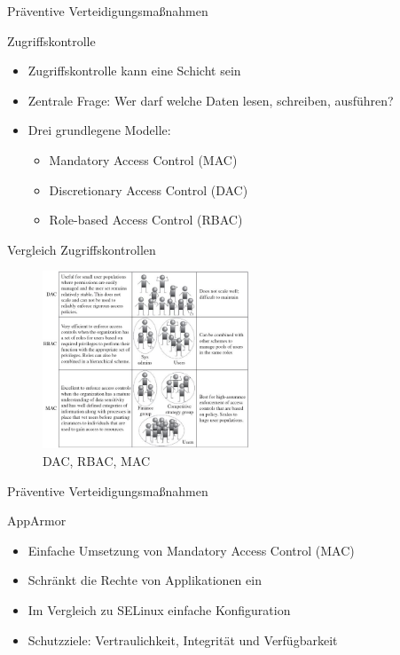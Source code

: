 \begin{frame}{Präventive Verteidigungsmaßnahmen}
  \begin{block}{Zugriffskontrolle}
    \begin{itemize}[<+->]
      \item Zugriffskontrolle kann eine Schicht sein
      \item Zentrale Frage: Wer darf welche Daten lesen, schreiben, ausführen?
      \item Drei grundlegene Modelle:
      \begin{itemize}[<+->]
        \item Mandatory Access Control (MAC)
        \item Discretionary Access Control (DAC)
        \item Role-based Access Control (RBAC)
      \end{itemize}
    \end{itemize}
  \end{block}
\end{frame}

\begin{frame}{Vergleich Zugriffskontrollen}
  \begin{figure}
    \centering
    \includegraphics[width=0.55\textwidth]{assets/access_control}
    \caption{DAC, RBAC, MAC \footnotemark}
  \end{figure}

\end{frame}

\begin{frame}{Präventive Verteidigungsmaßnahmen}
  \begin{block}{AppArmor}
    \begin{itemize}[<+->]
      \item Einfache Umsetzung von Mandatory Access Control (MAC)
      \item Schränkt die Rechte von Applikationen ein
      \item Im Vergleich zu SELinux einfache Konfiguration
      \item Schutzziele: Vertraulichkeit, Integrität und Verfügbarkeit
    \end{itemize}
  \end{block}
\end{frame}

